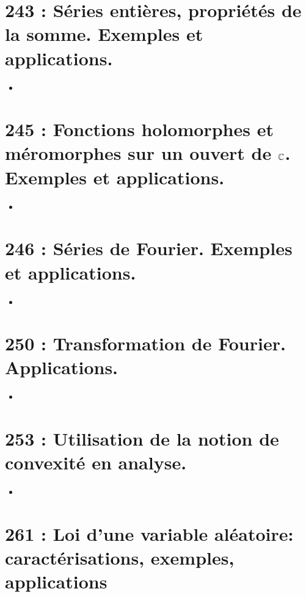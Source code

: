 \documentclass[a4paper,10pt,oneside,twocolumn,landscape]{book}
\begin{document}
\section{243 : Séries entières, propriétés de la somme. Exemples et applications.}

\begin{itemize}
	\item 
\end{itemize}

\section{245 : Fonctions holomorphes et méromorphes sur un ouvert de $\mathbb{C}$. Exemples et applications.}

\begin{itemize}
	\item 
\end{itemize}

\section{246 : Séries de Fourier. Exemples et applications.}

\begin{itemize}
	\item 
\end{itemize}

\section{250 : Transformation de Fourier. Applications.}

\begin{itemize}
	\item 
\end{itemize}

\section{253 : Utilisation de la notion de convexité en analyse.}

\begin{itemize}
	\item 
\end{itemize}


\section{261 : Loi d’une variable aléatoire: caractérisations, exemples, applications}
\end{document}
